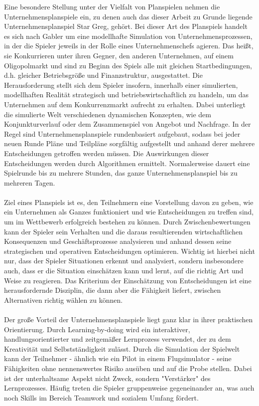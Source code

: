 Eine besondere Stellung unter der Vielfalt von Planspielen nehmen die Unternehmensplanspiele ein, zu denen auch das dieser Arbeit zu Grunde liegende Unternehmensplanspiel Star Greg, gehört. Bei dieser Art des Planspiels handelt es sich nach Gabler um eine modellhafte Simulation von Unternehmensprozessen, in der die Spieler jeweils in der Rolle eines Unternehmenschefs agieren. Das heißt, sie Konkurrieren unter ihren Gegner, den anderen Unternehmen, auf einem Oligopolmarkt und sind zu Beginn des Spiels alle mit gleichen Startbedingungen, d.h. gleicher Betriebsgröße und Finanzstruktur, ausgestattet. Die Herausforderung stellt sich dem Spieler insofern, innerhalb einer simulierten, modellhaften Realität strategisch und betriebswirtschaftlich zu handeln, um das Unternehmen auf dem Konkurrenzmarkt aufrecht zu erhalten. Dabei  unterliegt die simulierte Welt verschiedenen dynamischen Konzepten, wie dem Konjunkturverlauf oder dem Zusammenspiel von Angebot und Nachfrage. In der Regel sind Unternehmensplanspiele rundenbasiert aufgebaut, sodass bei jeder neuen Runde Pläne und Teilpläne sorgfältig aufgestellt und anhand derer mehrere Entscheidungen getroffen werden müssen. Die Auswirkungen dieser Entscheidungen werden durch Algorithmen ermittelt. Normalerweise dauert eine Spielrunde bis zu mehrere Stunden, das ganze Unternehmensplanspiel bis zu mehreren Tagen.
\\
\\
Ziel eines Planspiels ist es, den Teilnehmern eine Vorstellung davon zu geben, wie ein Unternehmen als Ganzes funktioniert und wie Entscheidungen zu treffen sind, um im Wettbewerb erfolgreich bestehen zu können. Durch Zwischenbewertungen kann der Spieler sein Verhalten und die daraus resultierenden wirtschaftlichen Konsequenzen und Geschäftsprozesse analysieren und anhand dessen seine strategischen und operativen Entscheidungen optimieren. Wichtig ist hierbei nicht nur, dass der Spieler Situationen erkennt und analysiert, sondern insbesondere auch, dass er die Situation einschätzen kann und lernt, auf die richtig Art und Weise zu reagieren. Das Kriterium der Einschätzung von Entscheidungen ist eine herausfordernde Disziplin, die dann aber die Fähigkeit liefert, zwischen Alternativen richtig wählen zu können. 
\\
\\
Der große Vorteil der Unternehmensplanspiele liegt ganz klar in ihrer praktischen Orientierung. Durch Learning-by-doing wird ein interaktiver, handlungsorientierter und zeitgemäßer Lernprozess verwendet, der zu dem Kreativität und Selbstständigkeit zulässt. Durch die Simulation der Spielwelt kann der Teilnehmer - ähnlich wie ein Pilot in einem Flugsimulator - seine Fähigkeiten ohne nennenswertes Risiko ausüben und auf die Probe stellen. Dabei ist der unterhaltsame Aspekt nicht Zweck, sondern "Verstärker" des Lernprozesses. Häufig treten die Spieler gruppenweise gegeneinander an, was auch noch Skills im Bereich Teamwork und sozialem Umfang fördert. 